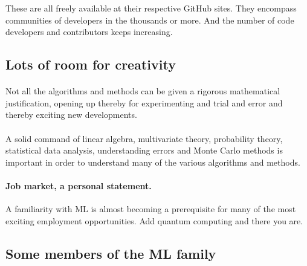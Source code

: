 \documentclass[%
oneside,                 %
final,                   %
10pt]{article}
\begin{document}
\noindent
These are all freely available at their respective GitHub sites. They 
encompass communities of developers in the thousands or more. And the number
of code developers and contributors keeps increasing.



\subsection{Lots of room for creativity}

\paragraph{}
Not all the
algorithms and methods can be given a rigorous mathematical
justification, opening up thereby for experimenting
and trial and error and thereby exciting new developments.




\paragraph{}
A solid command of linear algebra, multivariate theory, 
probability theory, statistical data analysis,
understanding errors and Monte Carlo methods is important in order to understand many of the 
various algorithms and methods.




\paragraph{\textbf{Job market, a personal statement}.}
A familiarity with ML is almost becoming a prerequisite for many of the most exciting employment 
opportunities. Add quantum computing and there you are.



\subsection{Some members of the ML family}


\end{document}
